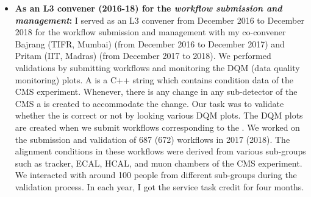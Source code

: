 \begin{itemize}[leftmargin=*]
{\begin{itemize}[leftmargin=*]
\item {\textbf{As an L3 convener (2016-18) for the \textit{workflow submission and 
management}:}
I served as an L3 convener from December 2016 to December 2018 for the workflow 
submission and management with my co-convener Bajrang (TIFR, Mumbai) (from December 2016 to 
December 2017) and Pritam (IIT, Madras) (from December 2017 to 2018). We performed  
validations by submitting workflows and monitoring the DQM (data quality 
monitoring) plots. A  is a C++ string which contains condition data of the 
CMS experiment. Whenever, there is any change in any sub-detector of the CMS a 
 is created to accommodate the change. Our task was to validate whether the 
is correct or not by looking various DQM plots. The DQM plots are created when 
we submit workflows corresponding to the . We worked on the submission  
and validation of 687 (672) workflows in 2017 (2018). The alignment conditions in 
these workflows were derived from various sub-groups such as tracker, ECAL, HCAL, 
and muon chambers of the CMS experiment. We interacted with around 100 people from 
different sub-groups during the validation process. In each year, I got the service task credit for
four months.

}
\end{itemize}}
\end{itemize}
